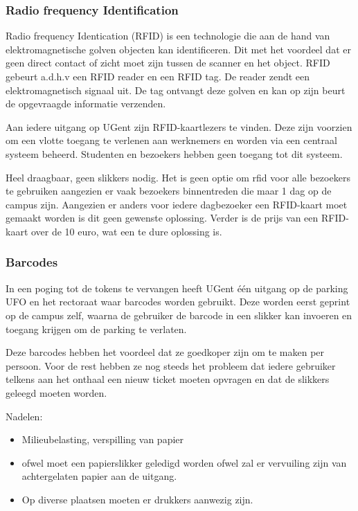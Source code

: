 \subsubsection{Radio frequency Identification}

Radio frequency Identication (RFID) is een technologie die aan de hand van elektromagnetische golven objecten kan identificeren. Dit met het voordeel dat er geen direct contact of zicht moet zijn tussen de scanner en het object. RFID gebeurt a.d.h.v een RFID reader en een RFID tag. De reader zendt een elektromagnetisch signaal uit. De tag ontvangt deze golven en kan op zijn beurt de opgevraagde informatie verzenden. \autocite{li2009design}

Aan iedere uitgang op UGent zijn RFID-kaartlezers te vinden. Deze zijn voorzien om een vlotte toegang te verlenen aan werknemers en worden via een centraal systeem beheerd. Studenten en bezoekers hebben geen toegang tot dit systeem.

Heel draagbaar, geen slikkers nodig.
Het is geen optie om rfid voor alle bezoekers te gebruiken aangezien er vaak bezoekers binnentreden die maar 1 dag op de campus zijn. Aangezien er anders voor iedere dagbezoeker een RFID-kaart moet gemaakt worden is dit geen gewenste oplossing. Verder is de prijs van een RFID-kaart over de 10 euro, wat een te dure oplossing is.

\subsubsection{Barcodes}
In een poging tot de tokens te vervangen heeft UGent één uitgang op de parking UFO en het rectoraat waar barcodes worden gebruikt. Deze worden eerst geprint op de campus zelf, waarna de gebruiker de barcode in een slikker kan invoeren en toegang krijgen om de parking te verlaten.

Deze barcodes hebben het voordeel dat ze goedkoper zijn om te maken per persoon. Voor de rest hebben ze nog steeds het probleem dat iedere gebruiker telkens aan het onthaal een nieuw ticket moeten opvragen en dat de slikkers geleegd moeten worden.

Nadelen:
\begin{itemize}
	\item Milieubelasting, verspilling van papier
	\item ofwel moet een papierslikker geledigd worden ofwel zal er vervuiling zijn van achtergelaten papier aan de uitgang.
	\item Op diverse plaatsen moeten er drukkers aanwezig zijn.
\end{itemize}


